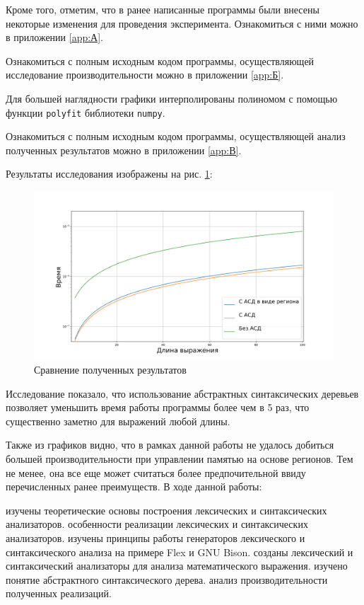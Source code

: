 \documentclass[coursework]{SCWorks}
\begin{document}
Кроме того, отметим, что в ранее написанные программы были внесены некоторые изменения для проведения эксперимента. Ознакомиться с ними можно в приложении \ref{app:А}.

Ознакомиться с полным исходным кодом программы, осуществляющей исследование производительности можно в приложении \ref{app:Б}.

Для большей наглядности графики интерполированы полиномом с помощью функции \texttt{polyfit} библиотеки \texttt{numpy}.

Ознакомиться с полным исходным кодом программы, осуществляющей анализ полученных результатов можно в приложении \ref{app:В}.

Результаты исследования изображены на рис. \ref{fig:2}:

\begin{figure}[h]

\centering

\includegraphics[scale=0.5]{benchmark.png}

\caption{Сравнение полученных результатов}

\label{fig:2}

\end{figure}
Исследование показало, что использование абстрактных синтаксических деревьев позволяет уменьшить время работы программы более чем в 5 раз, что существенно заметно для выражений любой длины.

Также из графиков видно, что в рамках данной работы не удалось добиться большей производительности при управлении памятью на основе регионов. Тем не менее, она все еще может считаться более предпочительной ввиду перечисленных ранее преимуществ.
\conclusion
В ходе данной работы:
\begin{enumerate}
     изучены теоретические основы построения лексических и синтаксических анализаторов.
     особенности реализации лексических и синтаксических анализаторов.
     изучены принципы работы генераторов лексического и синтаксического анализа на примере Flex и GNU Bison.
     созданы лексический и синтаксический анализаторы для анализа математического выражения.
     изучено понятие абстрактного синтаксического дерева.
     анализ производительности полученных реализаций.
\end{enumerate}
\end{document}
